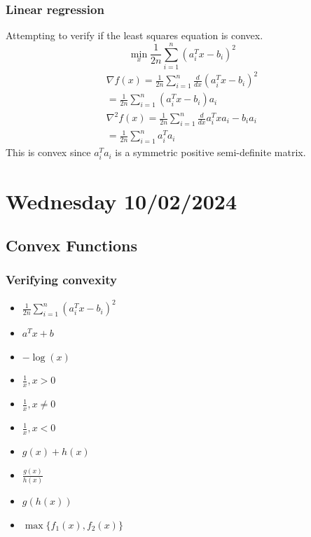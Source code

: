 \subsubsection{Linear regression}
Attempting to verify if the least squares equation is convex.
\begin{equation}
  \min_x \frac{1}{2n} \sum_{i=1}^n (a_i^T x - b_i)^2
\end{equation}
\begin{gather}
  \nabla f(x) = \frac{1}{2n} \sum_{i=1}^n \frac{d }{d x} (a_i^T x -b_i)^2 \\
  = \frac{1}{2n} \sum_{i=1}^n (a_i^T x -b_i)a_i \\
  \nabla^2 f(x) = \frac{1}{2n} \sum_{i=1}^n \frac{d }{d x} a_i^T x a_i - b_i a_i \\
  = \frac{1}{2n} \sum_{i=1}^n a_i^T a_i
\end{gather}
This is convex since $a_i^T a_i$ is a symmetric positive semi-definite matrix.

\section{Wednesday 10/02/2024}
\subsection{Convex Functions}
\subsubsection{Verifying convexity}
\begin{itemize}
  \item $\frac{1}{2n} \sum_{i=1}^n (a_i^T x - b_i)^2$
  \item $a^T x + b$
  \item $-\log(x)$
  \item $\frac{1}{x}, x>0$
  \item $\frac{1}{x}, x \neq 0$
  \item $\frac{1}{x}, x<0$
  \item $g(x) + h(x)$
  \item $\frac{g(x)}{h(x)}$
  \item $g(h(x))$
  \item $\max\{f_1(x),f_2(x)\}$
\end{itemize}
